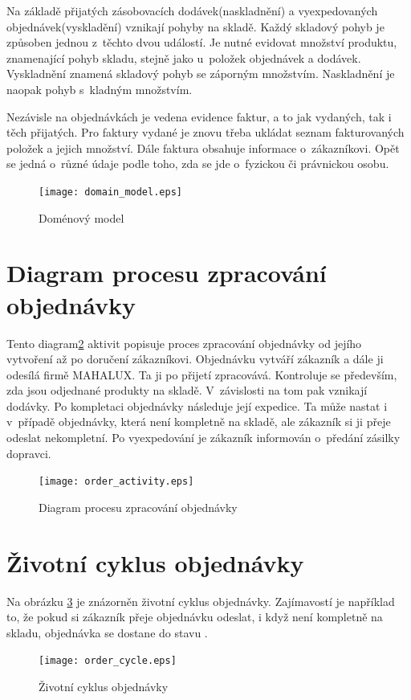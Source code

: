 \documentclass[thesis=B,czech]{FITthesis}[2012/06/26]
\begin{document}
	Na základě přijatých zásobovacích dodávek(naskladnění) a vyexpedovaných objednávek(vyskladění) vznikají pohyby na skladě. Každý skladový pohyb je způsoben jednou z~těchto dvou událostí. Je nutné evidovat množství produktu, znamenající pohyb skladu, stejně jako u~položek objednávek a dodávek. Vyskladnění znamená skladový pohyb se záporným množstvím. Naskladnění je naopak pohyb s~kladným množstvím.
	
	Nezávisle na objednávkách je vedena evidence faktur, a to jak vydaných, tak i těch přijatých. Pro faktury vydané je znovu třeba ukládat seznam fakturovaných položek a jejich množství. Dále faktura obsahuje informace o~zákazníkovi. Opět se jedná o~různé údaje podle toho, zda se jde o~fyzickou či právnickou osobu. 
	
\begin{figure}
	\texttt{[image: domain\_model.eps]}
	\caption{Doménový model}\label{domain_model}
\end{figure}

\section{Diagram procesu zpracování objednávky}
	Tento diagram\ref{order_activity} aktivit popisuje proces zpracování objednávky od jejího vytvoření až po doručení zákazníkovi. Objednávku vytváří zákazník a dále ji odesílá firmě MAHALUX. Ta ji po přijetí zpracovává. Kontroluje se především, zda jsou odjednané produkty na skladě. V~závislosti na tom pak vznikají dodávky. Po kompletaci objednávky následuje její expedice. Ta může nastat i v~případě objednávky, která není kompletně na skladě, ale zákazník si ji přeje odeslat nekompletní. Po vyexpedování je zákazník informován o~předání zásilky dopravci.

\begin{figure}
	\texttt{[image: order\_activity.eps]}
	\caption{Diagram procesu zpracování objednávky}\label{order_activity}
\end{figure}

\section{Životní cyklus objednávky}
	Na obrázku \ref{oredr_cycle} je znázorněn životní cyklus objednávky. Zajímavostí je například to, že pokud si zákazník přeje objednávku odeslat, i když není kompletně na skladu, objednávka se dostane do stavu . 
	
\begin{figure}
	\texttt{[image: order\_cycle.eps]}
	\caption{Životní cyklus objednávky}\label{oredr_cycle}
\end{figure}
\end{document}
